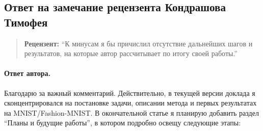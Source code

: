 \documentclass[11pt]{article}
\begin{document}
\pagestyle{empty}

\begin{center}
    \subsection*{Ответ на замечание рецензента Кондрашова Тимофея}
\end{center}

\begin{quote}
    \textbf{Рецензент:}
    ``К минусам я бы причислил отсутствие дальнейших шагов и результатов, на которые автор рассчитывает по итогу своей работы.''
\end{quote}

\paragraph{Ответ автора.}
Благодарю за важный комментарий. Действительно, в текущей версии доклада я сконцентрировался на постановке задачи,
описании метода и первых результатах на MNIST/Fashion-MNIST. В окончательной статье я планирую добавить раздел ``Планы и
будущие работы'', в котором подробно освещу следующие этапы:
\end{document}
